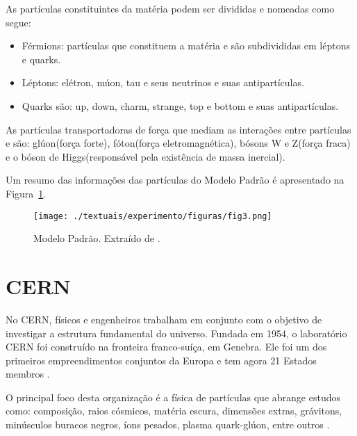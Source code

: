As partículas constituintes da matéria podem ser divididas e nomeadas como segue:
\begin{itemize}
  \item Férmions: partículas que constituem a matéria e são subdivididas em léptons e quarks.
  \item Léptons: elétron, múon, tau e seus neutrinos e suas antipartículas.
  \item Quarks são: up, down, charm, strange, top e bottom e suas antipartículas.
\end{itemize}


As partículas transportadoras de força que mediam as interações entre partículas e são: glúon(força forte), fóton(força eletromagnética), bósons W e Z(força fraca) e o bóson de Higgs(responsável pela existência de massa inercial).

Um resumo das informações das partículas do Modelo Padrão é apresentado na Figura~\ref{fig:2T02}.

\begin{figure}[!h]
  \centering
  \texttt{[image: ./textuais/experimento/figuras/fig3.png]}\\
  \caption{Modelo Padrão. Extraído de \cite{modelopadrao}.}
  \label{fig:2T02}
\end{figure}

\section{CERN}

No CERN, físicos e engenheiros trabalham em conjunto com o objetivo de investigar a estrutura fundamental do universo. Fundada em 1954, o laboratório CERN foi construído na fronteira franco-suíça, em Genebra. Ele foi um dos primeiros empreendimentos conjuntos da Europa e tem agora 21 Estados membros \cite{cernwebabout}.

O principal foco desta organização é a física de partículas que abrange estudos como: composição, raios cósmicos, matéria escura, dimensões extras, grávitons, minúsculos buracos negros, íons pesados, plasma quark-glúon, entre outros \cite{cernphisics}.

